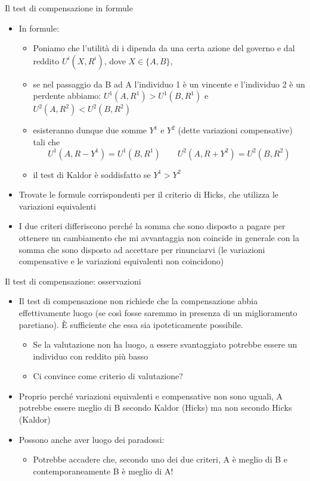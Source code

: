 \documentclass[aspectratio=149,11pt]{beamer}
\begin{document}
\begin{frame}{Il test di compensazione in formule}
\begin{itemize}
\item In formule:
\begin{itemize}
\item Poniamo che l’utilità di i dipenda da una certa azione del governo e dal
reddito $U^i(X, R^i)$, dove $X\in\{A, B\}$,
\item se nel passaggio da B ad A l’individuo 1 è un vincente e l’individuo 2 è
un perdente abbiamo:
$U^1(A, R^1) > U^1(B, R^1)$ e $U^2(A, R^2) < U^2(B, R^2)$
\item esisteranno dunque due somme $Y^1$ e $Y^2$ (dette variazioni compensative) tali che
\begin{equation*}
U^1(A, R - Y^1) = U^1(B, R^1) \qquad U^2(A, R + Y^2) = U^2(B, R^2)
\end{equation*}
\item il test di Kaldor è soddisfatto se $Y^1 >  Y^2$
\end{itemize}
\item Trovate le formule corrispondenti per il criterio di Hicks, che utilizza le
variazioni equivalenti
\item I due criteri differiscono perché la somma che sono disposto a pagare per
ottenere un cambiamento che mi avvantaggia non coincide in generale con la
somma che sono disposto ad accettare per rinunciarvi (le variazioni
compensative e le variazioni equivalenti non coincidono)
\end{itemize}
\end{frame}

\begin{frame}{Il test di compensazione: osservazioni}
\begin{itemize}
\item Il test di compensazione non richiede che la compensazione abbia effettivamente luogo (se così fosse saremmo in presenza di un miglioramento paretiano). È sufficiente che essa sia \alert{ipoteticamente} possibile.
\begin{itemize}
\item Se la valutazione non ha luogo, a essere svantaggiato potrebbe essere un individuo con reddito più basso
\item Ci convince come criterio di valutazione?
\end{itemize}
\item Proprio perché variazioni equivalenti e compensative non sono uguali, A potrebbe essere meglio di B secondo Kaldor (Hicks) ma non secondo Hicks (Kaldor)
\item Possono anche aver luogo dei paradossi: 
\begin{itemize}
\item Potrebbe accadere che, secondo uno dei due criteri, A è meglio di B e contemporaneamente B è meglio di A!
\end{itemize}
\end{itemize}
\end{frame}
\end{document}
